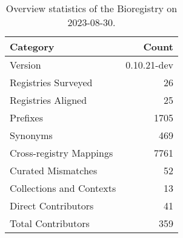 \begin{table}
\caption{Overview statistics of the Bioregistry on 2023-08-30.}
\label{tab:bioregistry-summary}
\begin{tabular}{lr}
\toprule
Category & Count \\
\midrule
Version & 0.10.21-dev \\
Registries Surveyed & 26 \\
Registries Aligned & 25 \\
Prefixes & 1705 \\
Synonyms & 469 \\
Cross-registry Mappings & 7761 \\
Curated Mismatches & 52 \\
Collections and Contexts & 13 \\
Direct Contributors & 41 \\
Total Contributors & 359 \\
\bottomrule
\end{tabular}
\end{table}
